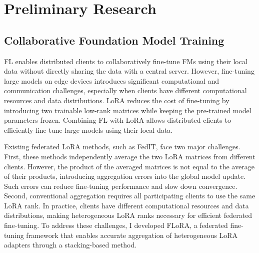 \documentclass[11pt]{article}
\begin{document}
\section{Preliminary Research}
\label{sec:preliminary}

\subsection{Collaborative Foundation Model Training}
\label{subsec:flora}

FL enables distributed clients to collaboratively fine-tune FMs using their local data without directly sharing the data with a central server. However, fine-tuning large models on edge devices introduces significant computational and communication challenges, especially when clients have different computational resources and data distributions. LoRA reduces the cost of fine-tuning by introducing two trainable low-rank matrices while keeping the pre-trained model parameters frozen. Combining FL with LoRA allows distributed clients to efficiently fine-tune large models using their local data.

Existing federated LoRA methods, such as FedIT, face two major challenges. First, these methods independently average the two LoRA matrices from different clients. However, the product of the averaged matrices is not equal to the average of their products, introducing aggregation errors into the global model update. Such errors can reduce fine-tuning performance and slow down convergence. Second, conventional aggregation requires all participating clients to use the same LoRA rank. In practice, clients have different computational resources and data distributions, making heterogeneous LoRA ranks necessary for efficient federated fine-tuning. To address these challenges, I developed FLoRA, a federated fine-tuning framework that enables accurate aggregation of heterogeneous LoRA adapters through a stacking-based method.
\end{document}
